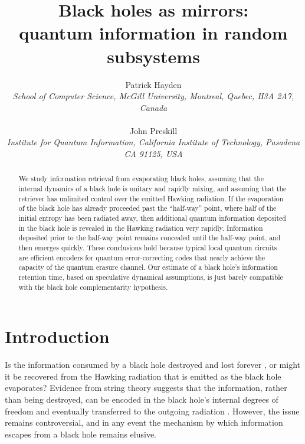 \documentclass[11pt]{article}
\begin{document}
\title{\bf Black holes as mirrors: \\quantum information in random subsystems}
\author{Patrick Hayden\\
{\em \small School of Computer Science, McGill University, Montreal, Quebec, H3A 2A7, Canada}\\ \\
John Preskill\\
{\em \small Institute for Quantum Information, California Institute of Technology, Pasadena CA 91125, USA}}
\date{}
\maketitle

\begin{abstract}
We study information retrieval from evaporating black holes, assuming that the internal dynamics of a black hole is unitary and rapidly mixing, and assuming that the retriever has unlimited control over the emitted Hawking radiation. If the evaporation of the black hole has already proceeded past the ``half-way'' point, where half of the initial entropy has been radiated away, then additional quantum information deposited in the black hole is revealed in the Hawking radiation very rapidly. Information deposited prior to the half-way point remains concealed until the half-way point, and then emerges quickly. These conclusions hold because typical local quantum circuits are efficient encoders for quantum error-correcting codes that nearly achieve the capacity of the quantum erasure channel. Our estimate of a black hole's information retention time, based on speculative dynamical assumptions, is just barely compatible with the black hole complementarity hypothesis. 


\end{abstract}

\section{Introduction}
Is the information consumed by a black hole destroyed and lost forever \cite{hawk2}, or might it be recovered from the Hawking radiation that is emitted as the black hole evaporates? Evidence from string theory suggests that the information, rather than being destroyed, can be encoded in the black hole's internal degrees of freedom and eventually transferred to the outgoing radiation \cite{strominger-vafa,ads-cft}. However, the issue remains controversial, and in any event the mechanism by which information escapes from a black hole remains elusive.
\end{document}
